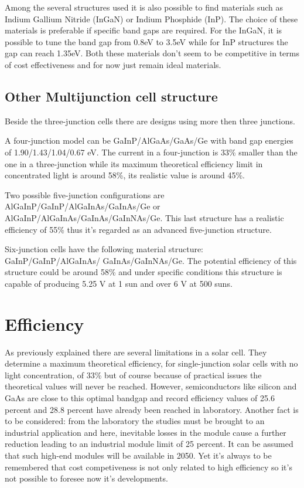 \documentclass[11pt]{article} %
\begin{document}
Among the several structures used it is also possible to find materials such as Indium Gallium Nitride (InGaN) or Indium Phosphide (InP). The choice of these materials is preferable if specific band gaps are required. For the InGaN, it is possible to tune the band gap from 0.8eV to 3.5eV while for InP structures the gap can reach 1.35eV. Both these materials don't seem to be competitive in terms of cost effectiveness and for now just remain ideal materials.

\subsection{Other Multijunction cell structure}

Beside the three-junction cells there are designs using more then three junctions.  

A four-junction model can be GaInP/AlGaAs/GaAs/Ge with band gap energies of 1.90/1.43/1.04/0.67 eV. The current in a four-junction is 33\% smaller than the one in a three-junction while its maximum theoretical efficiency limit in concentrated light is around 58\%, its realistic value is around 45\%.  

Two possible five-junction configurations are AlGaInP/GaInP/AlGaInAs/GaInAs/Ge or AlGaInP/AlGaInAs/GaInAs/GaInNAs/Ge. This last structure has a realistic efficiency  of 55\% thus it's regarded as an advanced five-junction structure. 

Six-junction cells have the following material structure: GaInP/GaInP/AlGaInAs/ GaInAs/GaInNAs/Ge. The potential efficiency of this structure could be around 58\% and under specific conditions this structure is capable of producing 5.25 V at 1 sun and over 6 V at 500 suns.

\section{Efficiency}
As previously explained there are several limitations in a solar cell. They determine a maximum theoretical efficiency, for single-junction solar cells with no light concentration, of 33\% but of course because of practical issues the theoretical values will never be reached. However, semiconductors like silicon and GaAs are close to this optimal bandgap and record efficiency values of 25.6 percent and 28.8 percent have already been reached in laboratory. Another fact is to be considered: from the laboratory the studies must be brought to an industrial application and here, inevitable losses in the module cause a further reduction leading to an industrial module limit of 25 percent. It can be assumed that such high-end modules will be available in 2050. Yet it’s always to be remembered that cost competiveness is not only related to high efficiency so it’s not possible to foresee now it’s developments. 
\end{document}
